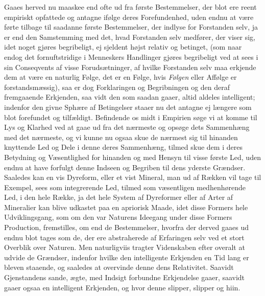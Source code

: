 \documentclass[12pt,a4paper]{book}
\newcommand{\apage}[1]{\marginnote{\footnotesize\textit{[#1]}}}
\begin{document}
Gaaes herved nu maaskee end ofte ud fra første Bestemmelser, der blot ere reent
empiriskt opfattede og antagne ifølge deres Forefundenhed, uden endnu at være
førte tilbage til saadanne første Bestemmelser, der indlyse for Forstanden selv,
ja er end den Samstemming med det, hvad Forstanden selv medfører, der viser sig,
idet noget gjøres begribeligt, ej sjeldent højst relativ og betinget, (som naar
endog det fornuftstridige i Menneskers Handlinger gjøres begribeligt ved at sees
i sin Conseqvents af visse Forudsætninger, af hvilke Forstanden selv maa erkjende
dem at være en naturlig Følge, det er en Følge, hvis \emph{Følgen} eller Affølge er
forstandsmæssig), saa er dog Forklaringen og Begribningen og den deraf
fremgaaende Erkjenden, saa vidt den som saadan gaaer, altid aldeles intelligent;
indenfor den givne Sphære af Betingelser staaer nu det antagne ej længere som
blot forefundet og tilfældigt. Befindende os midt i Empirien søge vi at komme til
Lys og Klarhed ved at gaae ud fra det nærmeste og opsøge dets Sammenhæng med det
nærmeste, og vi kunne nu ogsaa skue de nærmest sig til hinanden knyttende Led og
Dele i denne deres  \apage{63} Sammenhæng, tilmed skue dem i deres Betydning og
Væsentlighed for hinanden og med Hensyn til visse første Led, uden endnu at
have forfulgt denne Indseen og Begriben til dens yderste Grændser. Saaledes kan
en vis Dyreform, eller et vist Mineral, man ud af Rækken vil tage til Exempel,
sees som integrerende Led, tilmed som væsentligen medhenhørende Led, i den hele
Række, ja det hele System af Dyreformer eller af Arter af Mineralier kan blive
udkastet paa en apriorisk Maade, idet disse Formers hele Udviklingsgang, som om
den var Naturens Ideegang under disse Formers Production, fremstilles, om end de
Bestemmelser, hvorfra der derved gaaes ud endnu blot tages som de, der ere
abstraherede af Erfaringen selv ved et stort Overblik over Naturen. Men
naturligviis tragter Videnskaben efter overalt at udvide de Grændser, indenfor
hvilke den intelligente Erkjenden en Tid lang er bleven staaende, og saaledes at
overvinde denne dens Relativitet. Saavidt Gjenstandens sande, ægte, med Indsigt
forbundne Erkjendelse gaaer, saavidt gaaer ogsaa en intelligent Erkjenden, og
hvor denne slipper, slipper og hiin.
\end{document}
